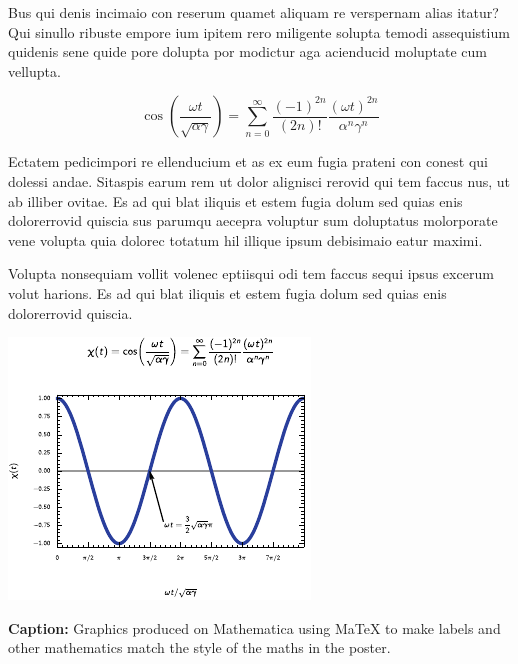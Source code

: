 \documentclass[a0paper,portrait]{baposter}
\begin{document}
\begin{poster}
{\begin{multicols}{2}

\small

Bus qui denis incimaio con reserum quamet aliquam re verspernam alias itatur? Qui sinullo ribuste empore ium ipitem rero miligente solupta temodi assequistium quidenis sene quide pore dolupta por modictur aga acienducid moluptate cum vellupta.

\begin{equation*}
\cos\mathopen{}\left(\frac{\omega t}{\sqrt{\alpha\gamma}}\right)\mathclose{} = \sum_{n=0}^\infty \frac{(-1)^{2n}}{(2n)!} \frac{(\omega t)^{2n}}{\alpha^{n}\gamma^{n}}
\end{equation*}



Ectatem pedicimpori re ellenducium et as ex eum fugia prateni con conest qui dolessi andae. Sitaspis earum rem ut dolor alignisci rerovid qui tem faccus nus, ut ab illiber ovitae. Es ad qui blat iliquis et estem fugia dolum sed quias enis dolorerrovid quiscia sus parumqu aecepra voluptur sum doluptatus molorporate vene volupta quia dolorec totatum hil illique ipsum debisimaio eatur maximi. 

\vfill\null
\columnbreak

Volupta nonsequiam vollit volenec eptiisqui odi tem faccus sequi ipsus excerum volut harions. Es ad qui blat iliquis et estem fugia dolum sed quias enis dolorerrovid quiscia.


\begin{center}
\includegraphics[scale=1,valign=T]{sample-figure.pdf}
\end{center}

\footnotesize \smaller
\textbf{Caption:} Graphics produced on Mathematica using MaTeX to make labels and other mathematics match the style of the maths in the poster.
\vfill\null
\end{multicols}

}
\end{poster}
\end{document}

